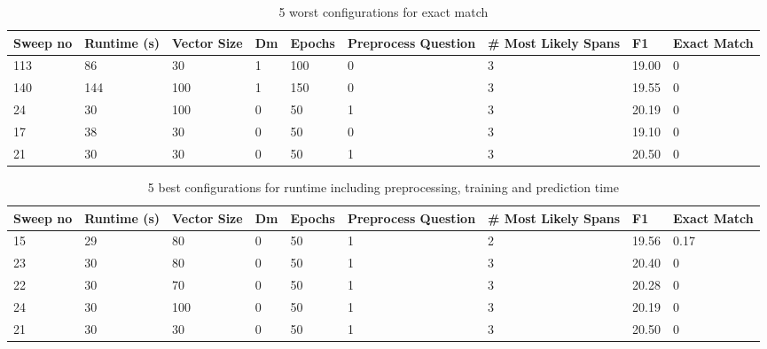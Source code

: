 \documentclass[11pt]{article}
\begin{document}
    \begin{table}[p]
        \centering
        \begin{tabularx}{\textwidth}{|X|X|X|X|X|X|X|X|X|}
            \hline
            Sweep no & Runtime (s) & Vector Size & Dm & Epochs & Preprocess Question & \# Most Likely Spans & F1 & Exact Match \\ \hline
            113      & 86          & 30          & 1  & 100    & 0                   & 3                    & 19.00 & 0           \\ \hline
            140      & 144         & 100         & 1  & 150    & 0                   & 3                    & 19.55 & 0           \\ \hline
            24       & 30          & 100         & 0  & 50     & 1                   & 3                    & 20.19 & 0           \\ \hline
            17       & 38          & 30          & 0  & 50     & 0                   & 3                    & 19.10 & 0           \\ \hline
            21       & 30          & 30          & 0  & 50     & 1                   & 3                    & 20.50 & 0           \\ \hline
        \end{tabularx}
        \caption{5 worst configurations for exact match}
        \label{table:5-worst-exact}
    \end{table}

    \begin{table}[p]
        \centering
        \begin{tabularx}{\textwidth}{|X|X|X|X|X|X|X|X|X|}
            \hline
            Sweep no & Runtime (s) & Vector Size & Dm & Epochs & Preprocess Question & \# Most Likely Spans & F1 & Exact Match \\ \hline
            15       & 29          & 80          & 0  & 50     & 1                   & 2                    & 19.56 & 0.17        \\ \hline
            23       & 30          & 80          & 0  & 50     & 1                   & 3                    & 20.40 & 0           \\ \hline
            22       & 30          & 70          & 0  & 50     & 1                   & 3                    & 20.28 & 0           \\ \hline
            24       & 30          & 100         & 0  & 50     & 1                   & 3                    & 20.19 & 0           \\ \hline
            21       & 30          & 30          & 0  & 50     & 1                   & 3                    & 20.50 & 0           \\ \hline
        \end{tabularx}
        \caption{5 best configurations for runtime including preprocessing, training and prediction time}
        \label{table:5-best-runtime}
    \end{table}
\end{document}
